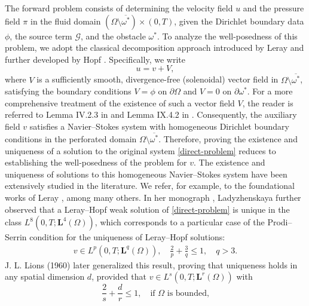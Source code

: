 \documentclass[a4paper,12pt,reqno,natbib]{amsart}
\def\L{\textbf{L}}
\begin{document}

\vspace{0.3cm}


The forward problem consists of determining the velocity field \( u \) and the pressure field \( \pi \) in the fluid domain \( (\Omega \setminus \overline{\omega^*}) \times (0, T) \), given the Dirichlet boundary data \( \phi \), the source term \( \mathcal{G} \), and the obstacle \( \omega^* \). To analyze the well-posedness of this problem, we adopt the classical decomposition approach introduced by Leray \cite{leray1933etude} and further developed by Hopf \cite{hopf1940allgemeiner,hopf1955nonlinear}. Specifically, we write
\[
u = v + V,
\]
where \( V \) is a sufficiently smooth, divergence-free (solenoidal) vector field in \( \Omega \setminus \overline{\omega^*} \), satisfying the boundary conditions \( V = \phi \) on \( \partial\Omega \) and \( V = 0 \) on \( \partial\omega^* \). For a more comprehensive treatment of the existence of such a vector field $V$, the reader is referred to Lemma IV.2.3 in \cite{girault2012finite} and Lemma IX.4.2 in \cite{galdi2011introduction}. Consequently, the auxiliary field \( v \) satisfies a Navier--Stokes system with homogeneous Dirichlet boundary conditions in the perforated domain \( \Omega \setminus \overline{\omega^*} \). Therefore, proving the existence and uniqueness of a solution to the original system \eqref{direct-problem} reduces to establishing the well-posedness of the problem for \( v \). The existence and uniqueness of solutions to this homogeneous Navier--Stokes system have been extensively studied in the literature. We refer, for example, to the foundational works of Leray \cite{leray1933etude,leray1934essai, leray1934mouvement}, among many others. In her monograph \cite{ladyzhenskaya1969mathematical}, Ladyzhenskaya further observed that a Leray--Hopf weak solution of \eqref{direct-problem} is unique in the class \( L^8(0, T ; \L^4(\Omega)) \), which corresponds to a particular case of the Prodi--Serrin condition \cite{prodi1959teorema, Serrin1963TheIV} for the uniqueness of Leray--Hopf solutions:
\begin{align}\label{c-L}
v \in L^p(0, T ; \L^q(\Omega)), \quad \frac{2}{p} + \frac{3}{q} \leq 1, \quad q > 3.
\end{align}
J. L. Lions (1960) later generalized this result, proving that uniqueness holds in any spatial dimension \( d \), provided that \( v \in L^s(0,T; \L^r(\Omega)) \) with
\begin{equation*}
    \frac{2}{s} + \frac{d}{r} \leq 1, \quad \text{if } \Omega \text{ is bounded,}
\end{equation*}
\end{document}
